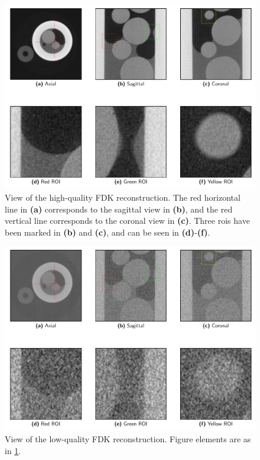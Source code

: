 \begin{figure}[htbp]
  \centering
  \includegraphics[width=.9\textwidth]{figures/kimroberthq-x475y620s250.pdf}
  \caption[High-quality]{View of the high-quality FDK reconstruction. The red horizontal line in \textbf{(a)} corresponds to the sagittal view in \textbf{(b)}, and the red vertical line corresponds to the coronal view in \textbf{(c)}. Three \acrshort{roi}s have been marked in \textbf{(b)} and \textbf{(c)}, and can be seen in \textbf{(d)}-\textbf{(f)}. }
  \label{fig:sideplothq}
\end{figure}

\begin{figure}[htbp]
  \centering
  \includegraphics[width=.9\textwidth]{figures/kimrobertfdk-x475y620s250.pdf}
  \caption[FDK]{View of the low-quality FDK reconstruction. Figure elements are as in \cref{fig:sideplothq}.} 
  \label{fig:sideplotfdk}
\end{figure}

